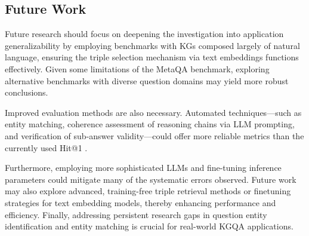 \documentclass[pdflatex,sn-mathphys-num]{sn-jnl}%
\theoremstyle{thmstyleone}%
\theoremstyle{thmstyletwo}%
\theoremstyle{thmstylethree}%
\begin{document}
\subsection{Future Work}
Future research should focus on deepening the investigation into application generalizability by employing benchmarks with KGs composed largely of natural language, ensuring the triple selection mechanism via text embeddings functions effectively. Given some limitations of the MetaQA benchmark, exploring alternative benchmarks with diverse question domains may yield more robust conclusions.

Improved evaluation methods are also necessary. Automated techniques—such as entity matching, coherence assessment of reasoning chains via LLM prompting, and verification of sub-answer validity—could offer more reliable metrics than the currently used Hit@1 \cite{Guo2023}.

Furthermore, employing more sophisticated LLMs and fine-tuning inference parameters could mitigate many of the systematic errors observed. Future work may also explore advanced, training-free triple retrieval methods or finetuning strategies for text embedding models, thereby enhancing performance and efficiency. Finally, addressing persistent research gaps in question entity identification and entity matching is crucial for real-world KGQA applications.





\end{document}
